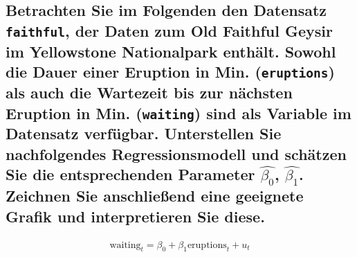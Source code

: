 \documentclass[12pt,a4paper]{article}
\begin{document}
\hypertarget{betrachten-sie-im-folgenden-den-datensatz-faithful-der-daten-zum-old-faithful-geysir-im-yellowstone-nationalpark-enthuxe4lt.-sowohl-die-dauer-einer-eruption-in-min.-eruptions-als-auch-die-wartezeit-bis-zur-nuxe4chsten-eruption-in-min.-waiting-sind-als-variable-im-datensatz-verfuxfcgbar.-unterstellen-sie-nachfolgendes-regressionsmodell-und-schuxe4tzen-sie-die-entsprechenden-parameter-widehatbeta_0-widehatbeta_1.-zeichnen-sie-anschlieuxdfend-eine-geeignete-grafik-und-interpretieren-sie-diese.}{%
\subsection{\texorpdfstring{Betrachten Sie im Folgenden den Datensatz
\texttt{faithful}, der Daten zum Old Faithful Geysir im Yellowstone
Nationalpark enthält. Sowohl die Dauer einer Eruption in Min.
(\texttt{eruptions}) als auch die Wartezeit bis zur nächsten Eruption in
Min. (\texttt{waiting}) sind als Variable im Datensatz verfügbar.
Unterstellen Sie nachfolgendes Regressionsmodell und schätzen Sie die
entsprechenden Parameter \(\widehat{\beta_0}\), \(\widehat{\beta_1}\).
Zeichnen Sie anschließend eine geeignete Grafik und interpretieren Sie
diese.}{Betrachten Sie im Folgenden den Datensatz faithful, der Daten zum Old Faithful Geysir im Yellowstone Nationalpark enthält. Sowohl die Dauer einer Eruption in Min. (eruptions) als auch die Wartezeit bis zur nächsten Eruption in Min. (waiting) sind als Variable im Datensatz verfügbar. Unterstellen Sie nachfolgendes Regressionsmodell und schätzen Sie die entsprechenden Parameter \textbackslash widehat\{\textbackslash beta\_0\}, \textbackslash widehat\{\textbackslash beta\_1\}. Zeichnen Sie anschließend eine geeignete Grafik und interpretieren Sie diese.}}\label{betrachten-sie-im-folgenden-den-datensatz-faithful-der-daten-zum-old-faithful-geysir-im-yellowstone-nationalpark-enthuxe4lt.-sowohl-die-dauer-einer-eruption-in-min.-eruptions-als-auch-die-wartezeit-bis-zur-nuxe4chsten-eruption-in-min.-waiting-sind-als-variable-im-datensatz-verfuxfcgbar.-unterstellen-sie-nachfolgendes-regressionsmodell-und-schuxe4tzen-sie-die-entsprechenden-parameter-widehatbeta_0-widehatbeta_1.-zeichnen-sie-anschlieuxdfend-eine-geeignete-grafik-und-interpretieren-sie-diese.}}

\begin{align*}
  \text{waiting}_t = \beta_0+\beta_1 \text{eruptions}_t + u_t 
\end{align*}
\end{document}
